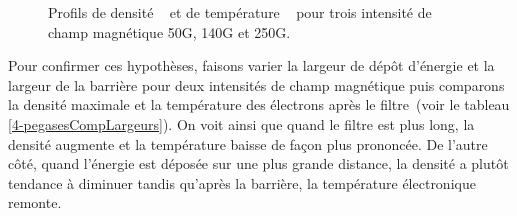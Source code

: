 \begin{refsection}
	\begin{figure}[htbp]
  \centering
    \caption{Profils de densité ~ et de
    température ~ pour trois intensité de
    champ magnétique 50G, 140G et 250G.}
    \label{4-pegasesCompMagProfile}
\end{figure}

Pour confirmer ces hypothèses, faisons varier la largeur de dépôt d'énergie
et la largeur de la barrière pour deux intensités de champ magnétique puis
comparons la densité maximale et la température des électrons après le
filtre~(voir le tableau \ref{4-pegasesCompLargeurs}). On voit ainsi que quand le
filtre est plus long, la densité augmente et la température baisse de façon plus
prononcée.
De l'autre côté, quand l'énergie est déposée sur une plus grande distance, la
densité a plutôt tendance à diminuer tandis qu'après la barrière, la
température électronique remonte.


\end{refsection}
